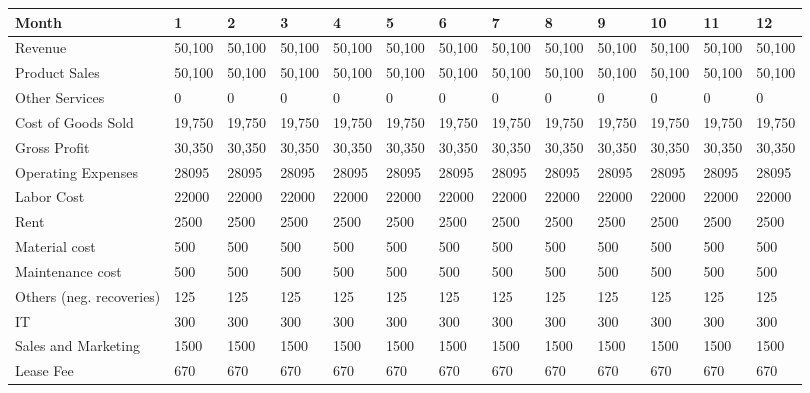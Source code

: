 \begin{tabular}{lllllllllllll}
\hline
 Month                    & 1      & 2      & 3      & 4      & 5      & 6      & 7      & 8      & 9      & 10     & 11     & 12     \\
\hline
 Revenue                  & 50,100 & 50,100 & 50,100 & 50,100 & 50,100 & 50,100 & 50,100 & 50,100 & 50,100 & 50,100 & 50,100 & 50,100 \\
 Product Sales            & 50,100 & 50,100 & 50,100 & 50,100 & 50,100 & 50,100 & 50,100 & 50,100 & 50,100 & 50,100 & 50,100 & 50,100 \\
 Other Services           & 0      & 0      & 0      & 0      & 0      & 0      & 0      & 0      & 0      & 0      & 0      & 0      \\
 Cost of Goods Sold       & 19,750 & 19,750 & 19,750 & 19,750 & 19,750 & 19,750 & 19,750 & 19,750 & 19,750 & 19,750 & 19,750 & 19,750 \\
 Gross Profit             & 30,350 & 30,350 & 30,350 & 30,350 & 30,350 & 30,350 & 30,350 & 30,350 & 30,350 & 30,350 & 30,350 & 30,350 \\
 Operating Expenses       & 28095  & 28095  & 28095  & 28095  & 28095  & 28095  & 28095  & 28095  & 28095  & 28095  & 28095  & 28095  \\
 Labor Cost               & 22000  & 22000  & 22000  & 22000  & 22000  & 22000  & 22000  & 22000  & 22000  & 22000  & 22000  & 22000  \\
 Rent                     & 2500   & 2500   & 2500   & 2500   & 2500   & 2500   & 2500   & 2500   & 2500   & 2500   & 2500   & 2500   \\
 Material cost            & 500    & 500    & 500    & 500    & 500    & 500    & 500    & 500    & 500    & 500    & 500    & 500    \\
 Maintenance cost         & 500    & 500    & 500    & 500    & 500    & 500    & 500    & 500    & 500    & 500    & 500    & 500    \\
 Others (neg. recoveries) & 125    & 125    & 125    & 125    & 125    & 125    & 125    & 125    & 125    & 125    & 125    & 125    \\
 IT                       & 300    & 300    & 300    & 300    & 300    & 300    & 300    & 300    & 300    & 300    & 300    & 300    \\
 Sales and Marketing      & 1500   & 1500   & 1500   & 1500   & 1500   & 1500   & 1500   & 1500   & 1500   & 1500   & 1500   & 1500   \\
 Lease Fee                & 670    & 670    & 670    & 670    & 670    & 670    & 670    & 670    & 670    & 670    & 670    & 670    \\

\end{tabular}
